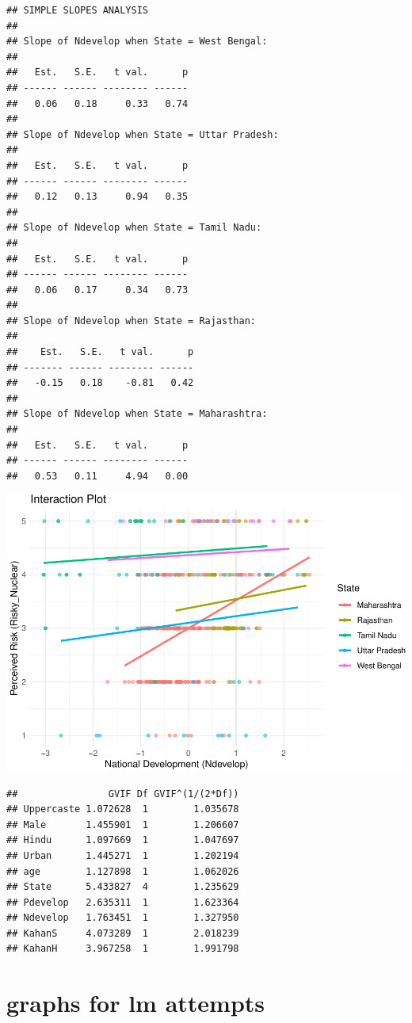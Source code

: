 \documentclass[
]{article}
\begin{document}
\begin{verbatim}
## SIMPLE SLOPES ANALYSIS 
## 
## Slope of Ndevelop when State = West Bengal: 
## 
##   Est.   S.E.   t val.      p
## ------ ------ -------- ------
##   0.06   0.18     0.33   0.74
## 
## Slope of Ndevelop when State = Uttar Pradesh: 
## 
##   Est.   S.E.   t val.      p
## ------ ------ -------- ------
##   0.12   0.13     0.94   0.35
## 
## Slope of Ndevelop when State = Tamil Nadu: 
## 
##   Est.   S.E.   t val.      p
## ------ ------ -------- ------
##   0.06   0.17     0.34   0.73
## 
## Slope of Ndevelop when State = Rajasthan: 
## 
##    Est.   S.E.   t val.      p
## ------- ------ -------- ------
##   -0.15   0.18    -0.81   0.42
## 
## Slope of Ndevelop when State = Maharashtra: 
## 
##   Est.   S.E.   t val.      p
## ------ ------ -------- ------
##   0.53   0.11     4.94   0.00
\end{verbatim}

\includegraphics{Paper1_files/figure-latex/unnamed-chunk-24-1.pdf}

\begin{verbatim}
##                GVIF Df GVIF^(1/(2*Df))
## Uppercaste 1.072628  1        1.035678
## Male       1.455901  1        1.206607
## Hindu      1.097669  1        1.047697
## Urban      1.445271  1        1.202194
## age        1.127898  1        1.062026
## State      5.433827  4        1.235629
## Pdevelop   2.635311  1        1.623364
## Ndevelop   1.763451  1        1.327950
## KahanS     4.073289  1        2.018239
## KahanH     3.967258  1        1.991798
\end{verbatim}

\hypertarget{graphs-for-lm-attempts}{%
\section{graphs for lm attempts}\label{graphs-for-lm-attempts}}
\end{document}
